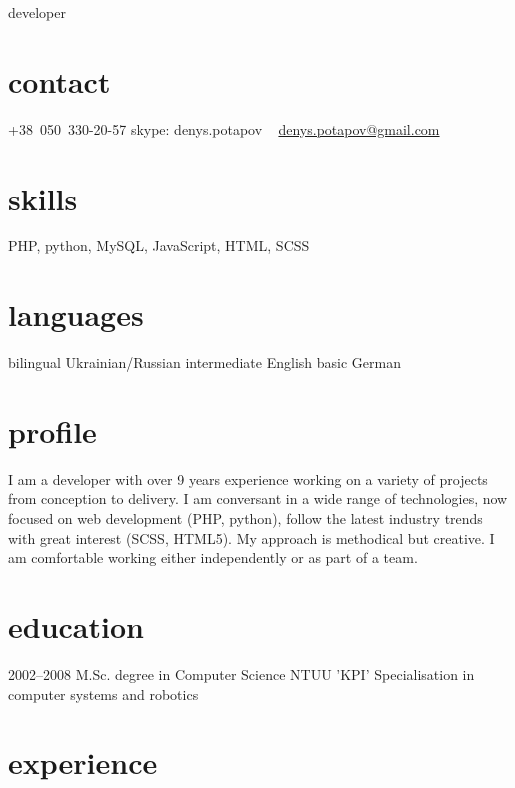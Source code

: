 \documentclass[hidelinks,a4paper]{cv}
\begin{document}
       {developer}


\begin{aside}
  \section{contact}
     +38~050~330-20-57
     skype: denys.potapov
     ~
     \href{mailto:denys.potapov@gmail.com}{denys.potapov@gmail.com}
  \section{skills}
    PHP, python, MySQL,
    JavaScript, HTML, SCSS
  \section{languages}
    bilingual Ukrainian/Russian
    intermediate English
    basic German
\end{aside}

\section{profile}
I am a developer with over 9 years experience working on a variety of projects from conception to delivery. I am conversant in a wide range of technologies, now focused on web development (PHP, python), follow the latest industry trends with great interest (SCSS, HTML5). My approach is methodical but creative. I am comfortable working either independently or as part of a team.
\section{education}

\begin{entrylist}
  \entry
    {2002–2008}
    {M.Sc. degree in Computer Science}
    {NTUU 'KPI'}
    {Specialisation in computer systems and robotics}
\end{entrylist}

\section{experience}
\end{document}
